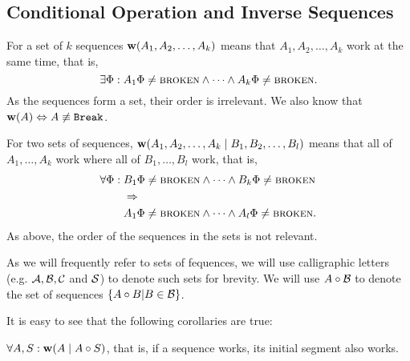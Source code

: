 

\subsection{Conditional Operation and Inverse Sequences}

\begin{mydef}[$\works{x}$]
For a set of $k$ sequences
$\mathbf{w}({A_1,A_2,\ldots,A_k})$ means that 
$A_1,A_2,\ldots,A_k$ work at the same time, that is,
\[\exists \Phi: A_1\Phi\neq\text{\normalfont\scshape{broken}} \wedge \cdots \wedge A_k\Phi\neq\text{\normalfont\scshape{broken}}.\]
As the sequences form a set, their order is irrelevant.
We also know that $\mathbf{w}({A}) \Leftrightarrow A\not\equiv \mathtt{Break}$. 
\end{mydef}

\begin{mydef}[$\worksc{x}{y}$]
For two sets of sequences, $\mathbf{w}({A_1,A_2,\ldots,A_k}\mathrel{|}{B_1,B_2,\ldots,B_l})$ means that 
all of $A_1,\ldots,A_k$ work where all of $B_1,\ldots,B_l$ work,
that is,
\begin{align*}
\forall \Phi:{}& 
B_1\Phi\neq\text{\normalfont\scshape{broken}} \wedge \cdots \wedge B_k\Phi\neq\text{\normalfont\scshape{broken}}\\
&\Rightarrow\\
&A_1\Phi\neq\text{\normalfont\scshape{broken}} \wedge \cdots \wedge A_l\Phi\neq\text{\normalfont\scshape{broken}}.
\end{align*}
As above, the order of the sequences in the sets is not relevant.
\end{mydef}

\begin{mydef}
As we will frequently refer to sets of fequences,
we will use calligraphic letters (e.g. $\mathcal{A, B, C}$ and $\mathcal{S}$)
to denote such sets for brevity.
We will use $A\circ\mathcal{B}$ to denote the set of sequences $\{A\circ B|B\in\mathcal{B}\}$.
\end{mydef}

It is easy to see that the following corollaries are true:



\begin{mycor}\label{worksextpostfix}
$\forall A,S: \mathbf{w}({A}\mathrel{|}{A\circ S})$, that is, if a sequence works, its initial segment also works.
\end{mycor}

